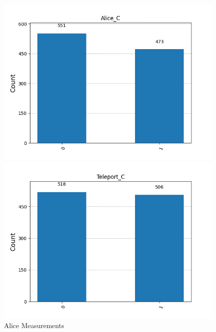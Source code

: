 \begin{figure}[h!]
    \centering
    \caption{Alice Measurements}
    \label{am2}    
    \begin{minipage}{0.49\textwidth}
        \centering
        \includegraphics[width=\linewidth]{exercise3/test/51c5350c-8263-4c16-85e8-2cce2067faf0__Alice_C__counts.png}
    \end{minipage}
    \hfill
    \begin{minipage}{0.49\textwidth}
        \centering
        \includegraphics[width=\linewidth]{exercise3/test/51c5350c-8263-4c16-85e8-2cce2067faf0__Teleport_C__counts.png}
    \end{minipage}
\end{figure}

